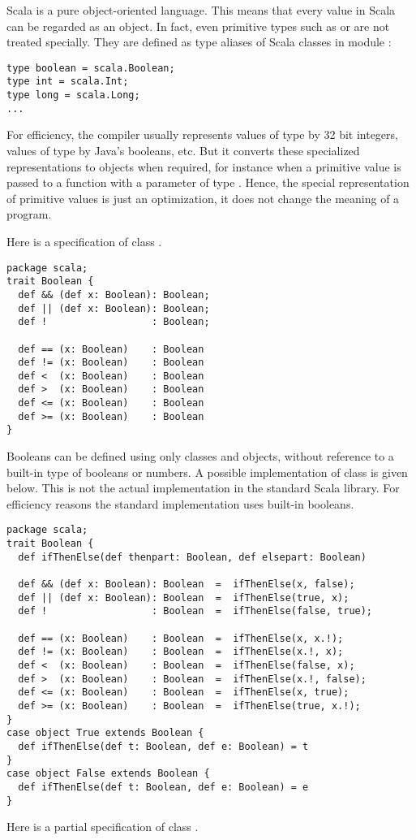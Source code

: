 \documentclass[a4paper,12pt,twoside,titlepage]{book}
\begin{document}

Scala is a pure object-oriented language. This means that every value
in Scala can be regarded as an object.  In fact, even primitive types
such as  or  are not treated specially. They
are defined as type aliases of Scala classes in module :
\begin{lstlisting}
type boolean = scala.Boolean;
type int = scala.Int;
type long = scala.Long;
...
\end{lstlisting}
For efficiency, the compiler usually represents values of type
 by 32 bit integers, values of type
 by Java's booleans, etc.  But it converts these
specialized representations to objects when required, for instance
when a primitive  value is passed to a function with a
parameter of type .  Hence, the special representation of
primitive values is just an optimization, it does not change the
meaning of a program.

Here is a specification of class .
\begin{lstlisting}
package scala;
trait Boolean {
  def && (def x: Boolean): Boolean;
  def || (def x: Boolean): Boolean;
  def !                  : Boolean;

  def == (x: Boolean)    : Boolean
  def != (x: Boolean)    : Boolean
  def <  (x: Boolean)    : Boolean
  def >  (x: Boolean)    : Boolean
  def <= (x: Boolean)    : Boolean
  def >= (x: Boolean)    : Boolean
}
\end{lstlisting}
Booleans can be defined using only classes and objects, without
reference to a built-in type of booleans or numbers. A possible
implementation of class  is given below.  This is not
the actual implementation in the standard Scala library. For
efficiency reasons the standard implementation uses built-in
booleans.
\begin{lstlisting}
package scala;
trait Boolean {
  def ifThenElse(def thenpart: Boolean, def elsepart: Boolean)

  def && (def x: Boolean): Boolean  =  ifThenElse(x, false);
  def || (def x: Boolean): Boolean  =  ifThenElse(true, x);
  def !                  : Boolean  =  ifThenElse(false, true);

  def == (x: Boolean)    : Boolean  =  ifThenElse(x, x.!);
  def != (x: Boolean)    : Boolean  =  ifThenElse(x.!, x);
  def <  (x: Boolean)    : Boolean  =  ifThenElse(false, x);
  def >  (x: Boolean)    : Boolean  =  ifThenElse(x.!, false);
  def <= (x: Boolean)    : Boolean  =  ifThenElse(x, true);
  def >= (x: Boolean)    : Boolean  =  ifThenElse(true, x.!);
}
case object True extends Boolean {
  def ifThenElse(def t: Boolean, def e: Boolean) = t
}
case object False extends Boolean {
  def ifThenElse(def t: Boolean, def e: Boolean) = e
}
\end{lstlisting}
Here is a partial specification of class .
\end{document}
